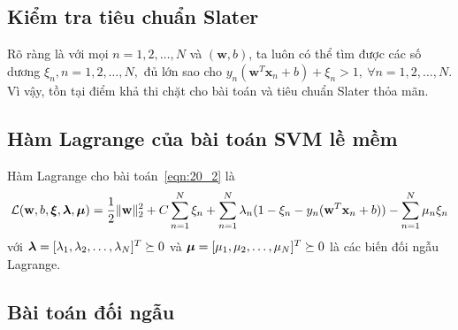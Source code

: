 \subsection{Kiểm tra tiêu chuẩn Slater}

Rõ ràng là với mọi $n = 1, 2, \dots, N$ và $(\mathbf{w}, b)$, ta luôn có thể tìm được các số {dương} $\xi_n, n = 1, 2, \dots, N,$ đủ lớn sao cho
\begin{math}
y_n(\mathbf{w}^T\mathbf{x}_n + b) + \xi_n > 1, ~\forall n = 1, 2, \dots, N
\end{math}.
Vì vậy, tồn tại điểm khả thi chặt cho bài toán và tiêu chuẩn Slater thỏa mãn.


\subsection{Hàm Lagrange của bài toán SVM lề mềm}
Hàm Lagrange cho bài toán~\eqref{eqn:20_2} là
\begin{equation}
\label{eqn:20_3}
\mathcal{L}(\mathbf{w}, b, \boldsymbol{\xi}, \boldsymbol{\lambda}, \boldsymbol{\mu}) =
\frac{1}{2}{\|\mathbf{w}\|_2^2} + C \sum_{n=1}^N \xi_n + \sum_{n=1}^N \lambda_n ( 1 - \xi_n - y_n(\mathbf{w}^T\mathbf{x}_n + b)) - \sum_{n=1}^N \mu_n \xi_n
\end{equation}
với $\boldsymbol{\lambda} = [\lambda_1, \lambda_2, \dots, \lambda_N]^T \succeq 0$ và $\boldsymbol{\mu} =
[\mu_1, \mu_2, \dots, \mu_N]^T \succeq 0$ là các biến đối ngẫu Lagrange.


\subsection{Bài toán đối ngẫu }

